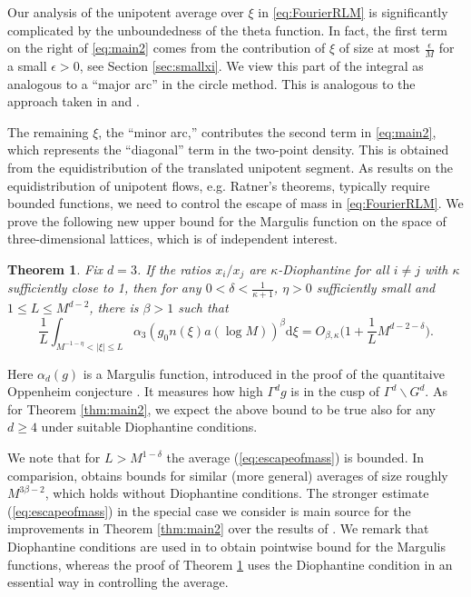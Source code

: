 \documentclass[12pt]{amsart}
\newtheorem{thm}{Theorem}[section]
\theoremstyle{definition}
\theoremstyle{remark}
\numberwithin{equation}{section}
\newcommand{\dd}{\mathrm{d}}
\begin{document}
Our analysis of the unipotent average over $\xi$ in \eqref{eq:FourierRLM} is significantly complicated by the unboundedness of the theta function.
In fact, the first term on the right of \eqref{eq:main2} comes from the contribution of $\xi$ of size at most $\tfrac{\epsilon}{M}$ for a small $\epsilon > 0$, see Section \ref{sec:smallxi}.
We view this part of the integral as analogous to a ``major arc'' in the circle method. This is analogous to the approach taken in \cite{Marklof2002,Marklof2003} and \cite{BGHM2022}.

The remaining $\xi$, the ``minor arc,'' contributes the second term in \eqref{eq:main2}, which represents the ``diagonal'' term in the two-point density.
This is obtained from the equidistribution of the translated unipotent segment.
As results on the equidistribution of unipotent flows, e.g. Ratner's theorems, typically require bounded functions, we need to control the escape of mass in \eqref{eq:FourierRLM}.
We prove the following new upper bound for the Margulis function on the space of three-dimensional lattices, which is of independent interest.
\begin{thm}
  \label{thm:escapeofmass}
  Fix $d = 3$.
  If the ratios $x_i/x_j$ are $\kappa$-Diophantine for all $i \neq j$ with $\kappa$ sufficiently close to 1,
 then for any $0 < \delta < \tfrac{1}{\kappa + 1}$, $\eta >0$ sufficiently small and $1 \leq L \leq M^{d-2} $, there is $\beta > 1$ such that
  \begin{equation}
    \label{eq:escapeofmass}
    \frac{1}{L} \int_{M^{-1-\eta} < |\xi| \leq L} \alpha_3(g_0n(\xi)a(\log M))^\beta \dd \xi =
    O_{\beta,\kappa}\bigg(1+\frac{1}{L} M^{d-2 - \delta}\bigg).
  \end{equation}
\end{thm}


Here $\alpha_d(g)$ is a Margulis function, introduced in the proof of the quantitaive Oppenheim conjecture \cite{EskinMargulisMozes1998}. It measures how high $\Gamma^d g$ is in the cusp of $\Gamma^d \backslash G^d$. As for Theorem \ref{thm:main2}, we expect the above bound to be true also for any  $d\geq 4$ under suitable Diophantine conditions.

  We note that for $L > M^{1 - \delta}$ the average (\ref{eq:escapeofmass}) is bounded.
  In comparision, \cite{BGHM2022} obtains bounds for similar (more general) averages of size roughly $M^{3\beta -2}$, which holds without Diophantine conditions.
  The stronger estimate (\ref{eq:escapeofmass}) in the special case we consider is main source for the improvements in Theorem \ref{thm:main2} over the results of \cite{BGHM2022}.
  We remark that Diophantine conditions are used in \cite{BGHM2022} to obtain pointwise bound for the Margulis functions, whereas the proof of Theorem \ref{thm:escapeofmass} uses the Diophantine condition in an essential way in controlling the average.
\end{document}
